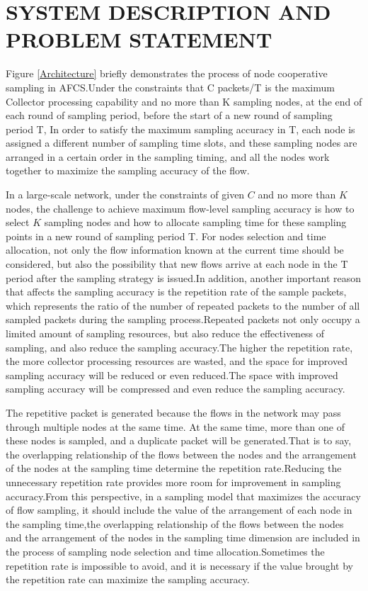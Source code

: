 \documentclass[conference]{IEEEtran}
\begin{document}
\section{SYSTEM DESCRIPTION AND PROBLEM STATEMENT }

Figure \ref{Architecture} briefly demonstrates the process of node cooperative sampling in AFCS.Under the constraints that C packets/T is the maximum Collector processing capability and no more than K sampling nodes, at the end of each round of sampling period, before the start of a new round of sampling period T,
In order to satisfy the maximum sampling accuracy in T, each node is assigned a different number of sampling time slots, and these sampling nodes are arranged in a certain order in the sampling timing, and all the nodes work together to maximize the sampling accuracy of the flow.

In a large-scale network, under the constraints of given $C$ and no more than $K$ nodes, the challenge to achieve maximum flow-level sampling accuracy is how to select $K$ sampling nodes and how to allocate sampling time for these sampling points in a new round of sampling period T. For nodes selection and time allocation, not only the flow information known at the current time should be considered, but also the possibility that new flows arrive at each node in the T period after the sampling strategy is issued.In addition, another important reason that affects the sampling accuracy is the repetition rate of the sample packets, which represents the ratio of the number of repeated packets to the number of all sampled packets during the sampling process.Repeated packets not only occupy a limited amount of sampling resources, but also reduce the effectiveness of sampling, and also reduce the sampling accuracy.The higher the repetition rate, the more collector processing resources are wasted, and the space for improved sampling accuracy will be reduced or even reduced.The space with improved sampling accuracy will be compressed and even reduce the sampling accuracy.

The repetitive packet is generated because the flows in the network may pass through multiple nodes at the same time. At the same time, more than one of these nodes is sampled, and a duplicate packet will be generated.That is to say, the overlapping relationship of the flows between the nodes and the arrangement of the nodes at the sampling time determine the repetition rate.Reducing the unnecessary repetition rate provides more room for improvement in sampling accuracy.From this perspective, in a sampling model that maximizes the accuracy of flow sampling, it should include the value of the arrangement of each node in the sampling time,the overlapping relationship of the flows between the nodes and the arrangement of the nodes in the sampling time dimension are included in the process of sampling node selection and time allocation.Sometimes the repetition rate is impossible to avoid, and it is necessary if the value brought by the repetition rate can maximize the sampling accuracy.
\end{document}
